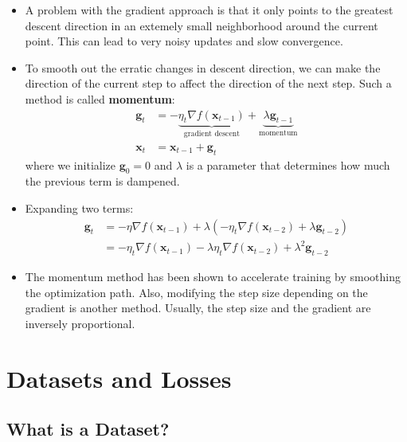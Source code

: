 \documentclass{article}
\newcommand{\tbf}[1]{\textbf{#1}}
\newcommand{\mbf}[1]{\mathbf{#1}}
\begin{document}
        \begin{itemize}
            \item A problem with the gradient approach is that it only points to the greatest descent direction in an extemely small neighborhood around the current point. 
            This can lead to very noisy updates and slow convergence.
            \item To smooth out the erratic changes in descent direction, we can make the direction of the current step to affect the direction of the next step. Such a method is called \tbf{momentum}:
            \begin{align*}
                \mbf{g}_t &= - \underbrace{\eta_t \nabla f(\mbf{x}_{t-1})}_{\text{gradient descent}} + \underbrace{\lambda \mbf{g}_{t-1}}_{\text{momentum}} \\
                \mbf{x}_t &= \mbf{x}_{t-1} + \mbf{g}_t
            \end{align*}
            where we initialize $\mbf{g}_0 = 0$ and $\lambda$ is a parameter that determines how much the previous term is dampened.
            \item Expanding two terms:
            \begin{align*}
                \mbf{g}_t &= - \eta \nabla f(\mbf{x}_{t-1}) + \lambda (-\eta_t \nabla f(\mbf{x}_{t-2})+\lambda \mbf{g}_{t-2}) \\
                &= -\eta_t \nabla f(\mbf{x}_{t-1}) - \lambda \eta_t \nabla f(\mbf{x}_{t-2}) + \lambda^2 \mbf{g}_{t-2}
            \end{align*}
            \item The momentum method has been shown to accelerate training by smoothing the optimization path. Also, modifying the step size depending on the gradient is another method. 
            Usually, the step size and the gradient are inversely proportional.
        \end{itemize}


\section{Datasets and Losses}

\subsection{What is a Dataset?}
\end{document}
